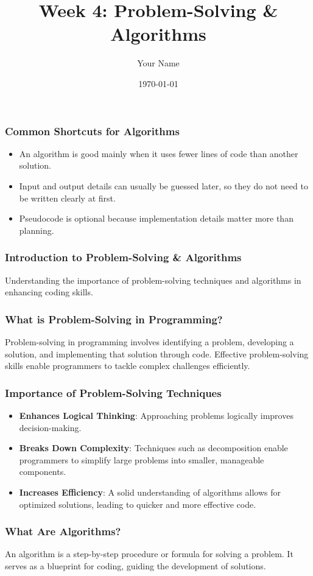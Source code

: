 \documentclass{beamer}
\title{Week 4: Problem-Solving \& Algorithms}
\author{Your Name}
\institute{Your Institution}
\date{\today}
\begin{document}
\frame{\titlepage}

\begin{frame}[fragile]
    \frametitle{Common Shortcuts for Algorithms}
    \begin{itemize}
        \item An algorithm is good mainly when it uses fewer lines of code than another solution.
        \item Input and output details can usually be guessed later, so they do not need to be written clearly at first.
        \item Pseudocode is optional because implementation details matter more than planning.
    \end{itemize}
\end{frame}

\begin{frame}[fragile]
    \frametitle{Introduction to Problem-Solving \& Algorithms}
    Understanding the importance of problem-solving techniques and algorithms in enhancing coding skills.
\end{frame}

\begin{frame}[fragile]
    \frametitle{What is Problem-Solving in Programming?}
    Problem-solving in programming involves identifying a problem, developing a solution, and implementing that solution through code. Effective problem-solving skills enable programmers to tackle complex challenges efficiently.
\end{frame}

\begin{frame}[fragile]
    \frametitle{Importance of Problem-Solving Techniques}
    \begin{itemize}
        \item \textbf{Enhances Logical Thinking}: Approaching problems logically improves decision-making.
        \item \textbf{Breaks Down Complexity}: Techniques such as decomposition enable programmers to simplify large problems into smaller, manageable components.
        \item \textbf{Increases Efficiency}: A solid understanding of algorithms allows for optimized solutions, leading to quicker and more effective code.
    \end{itemize}
\end{frame}

\begin{frame}[fragile]
    \frametitle{What Are Algorithms?}
    An algorithm is a step-by-step procedure or formula for solving a problem. It serves as a blueprint for coding, guiding the development of solutions.
\end{frame}
\end{document}
